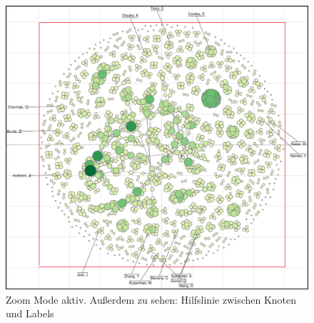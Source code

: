 \begin{figure}[H]
    \centering
    \includegraphics[scale=0.14]{../img/zoom}
    \caption{Zoom Mode aktiv. Außerdem zu sehen: Hilfslinie zwischen Knoten und Labels}
    \label{fig:zoom}
\end{figure}